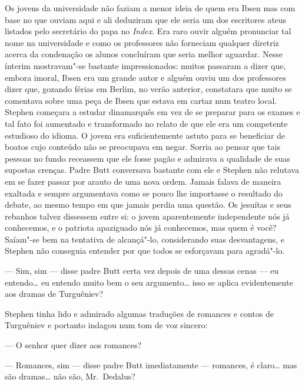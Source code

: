 Os jovens da universidade não faziam a menor ideia de quem era Ibsen
mas com base no que ouviam aqui e ali deduziram que ele seria um dos
\label{escritores"-ateus} escritores ateus listados pelo secretário do papa no \textit{Index}.
Era raro ouvir alguém pronunciar tal nome na universidade e como os
professores não forneciam qualquer diretriz acerca da condenação os
alunos concluíram que seria melhor aguardar.  Nesse ínterim
mostravam"-se bastante impressionados: muitos passaram a dizer que,
embora imoral, Ibsen era um grande autor e alguém ouviu um dos
professores dizer que, gozando férias em Berlim, no verão anterior,
constatara que muito se comentava sobre uma peça de Ibsen que estava em
cartaz num teatro local.  Stephen começara a estudar dinamarquês em vez
de se preparar para os exames e tal fato foi aumentado e transformado
no relato de que ele era um competente estudioso do idioma.  O jovem
era suficientemente astuto para se beneficiar de boatos cujo conteúdo
não se preocupava em negar.  Sorria ao pensar que tais pessoas no fundo
receassem que ele fosse pagão e admirava a qualidade de suas supostas
crenças.  Padre Butt conversava bastante com ele e Stephen não relutava
em \label{se"-fazer} se fazer passar por arauto de uma nova ordem.  Jamais falava de
maneira exaltada e sempre argumentava como se pouco lhe importasse o
resultado do debate, ao mesmo tempo em que jamais perdia uma questão.
Os jesuítas e seus rebanhos talvez dissessem entre si: o \label{jovem"-aparentemente} jovem
aparentemente independente nós já conhecemos, e o patriota apaziguado
nós já conhecemos, mas quem é você?  Saíam"-se bem na tentativa de
alcançá"-lo, \label{considerando"-suas} considerando suas desvantagens, e Stephen não conseguia
entender por que todos se esforçavam para agradá"-lo.

--- Sim, sim --- disse padre Butt certa vez depois de uma dessas
cenas --- eu entendo\ldots{} eu entendo muito bem o seu argumento\ldots{} isso se
aplica evidentemente aos dramas de Turguêniev?

Stephen tinha lido e admirado algumas traduções de romances e contos
de Turguêniev e portanto indagou num tom de voz sincero:

--- O senhor quer dizer aos romances?

--- Romances, sim --- disse padre Butt imediatamente --- romances, é
claro\ldots{} mas são dramas\ldots{} não são, Mr.~Dedalus?

